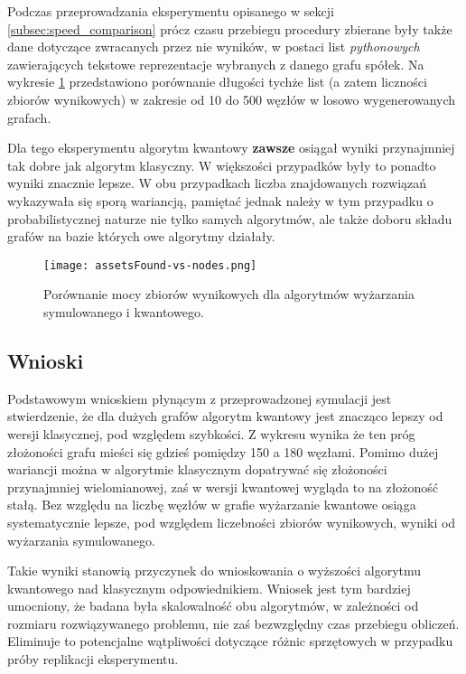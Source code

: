\documentclass[12pt,a4paper,twoside,openany]{book}
\begin{document}
Podczas przeprowadzania eksperymentu opisanego w sekcji \ref{subsec:speed_comparison} prócz czasu przebiegu procedury zbierane były także dane dotyczące zwracanych przez nie wyników, w postaci list \textit{pythonowych} zawierających tekstowe reprezentacje wybranych z danego grafu spółek.
Na wykresie \ref{fig:quality_comparison} przedstawiono porównanie długości tychże list (a zatem liczności zbiorów wynikowych) w zakresie od 10 do 500 węzłów w losowo wygenerowanych grafach.

Dla tego eksperymentu algorytm kwantowy \textbf{zawsze} osiągał wyniki przynajmniej tak dobre jak algorytm klasyczny.
W większości przypadków były to ponadto wyniki znacznie lepsze.
W obu przypadkach liczba znajdowanych rozwiązań wykazywała się sporą wariancją, pamiętać jednak należy w tym przypadku o probabilistycznej naturze nie tylko samych algorytmów, ale także doboru składu grafów na bazie których owe algorytmy działały.



\begin{figure}[H]
\texttt{[image: assetsFound-vs-nodes.png]}
\caption{Porównanie mocy zbiorów wynikowych dla algorytmów wyżarzania symulowanego i kwantowego.}
\label{fig:quality_comparison}
\end{figure}

\subsection{Wnioski}

Podstawowym wnioskiem płynącym z przeprowadzonej symulacji jest stwierdzenie, że dla dużych grafów algorytm kwantowy jest znacząco lepszy od wersji klasycznej, pod względem szybkości.
Z wykresu wynika że ten próg złożoności grafu mieści się gdzieś pomiędzy 150 a 180 węzłami.
Pomimo dużej wariancji można w algorytmie klasycznym dopatrywać się złożoności przynajmniej wielomianowej, zaś w wersji kwantowej wygląda to na złożoność stałą.
Bez względu na liczbę węzłów w grafie wyżarzanie kwantowe osiąga systematycznie lepsze, pod względem liczebności zbiorów wynikowych, wyniki od wyżarzania symulowanego.


Takie wyniki stanowią przyczynek do wnioskowania o wyższości algorytmu kwantowego nad klasycznym odpowiednikiem.
Wniosek jest tym bardziej umocniony, że badana była skalowalność obu algorytmów, w zależności od rozmiaru rozwiązywanego problemu, nie zaś bezwzględny czas przebiegu obliczeń.
Eliminuje to potencjalne wątpliwości dotyczące różnic sprzętowych w przypadku próby replikacji eksperymentu.
\end{document}
